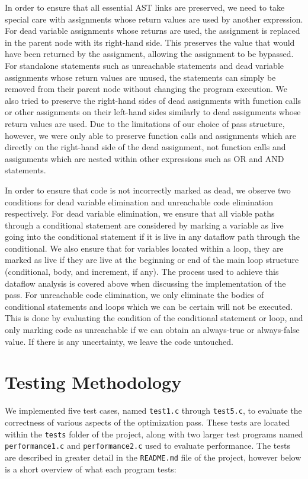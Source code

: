 \documentclass[sigconf]{acmart}
\begin{document}
In order to ensure that all essential AST links are preserved, we need to take special care with assignments whose return values are used by another expression. For dead variable assignments whose returns are used, the assignment is replaced in the parent node with its right-hand side. This preserves the value that would have been returned by the assignment, allowing the assignment to be bypassed. For standalone statements such as unreachable statements and dead variable assignments whose return values are unused, the statements can simply be removed from their parent node without changing the program execution. We also tried to preserve the right-hand sides of dead assignments with function calls or other assignments on their left-hand sides similarly to dead assignments whose return values are used. Due to the limitations of our choice of pass structure, however, we were only able to preserve function calls and assignments which are directly on the right-hand side of the dead assignment, not function calls and assignments which are nested within other expressions such as OR and AND statements.

In order to ensure that code is not incorrectly marked as dead, we observe two conditions for dead variable elimination and unreachable code elimination respectively. For dead variable elimination, we ensure that all viable paths through a conditional statement are considered by marking a variable as live going into the conditional statement if it is live in any dataflow path through the conditional. We also ensure that for variables located within a loop, they are marked as live if they are live at the beginning or end of the main loop structure (conditional, body, and increment, if any). The process used to achieve this dataflow analysis is covered above when discussing the implementation of the pass. For unreachable code elimination, we only eliminate the bodies of conditional statements and loops which we can be certain will not be executed. This is done by evaluating the condition of the conditional statement or loop, and only marking code as unreachable if we can obtain an always-true or always-false value. If there is any uncertainty, we leave the code untouched.

\section{Testing Methodology}
We implemented five test cases, named \verb|test1.c| through \verb|test5.c|, to evaluate the correctness of various aspects of the optimization pass. These tests are located within the \verb|tests| folder of the project, along with two larger test programs named \verb|performance1.c| and \verb|performance2.c| used to evaluate performance. The tests are described in greater detail in the \verb|README.md| file of the project, however below is a short overview of what each program tests:
\end{document}
